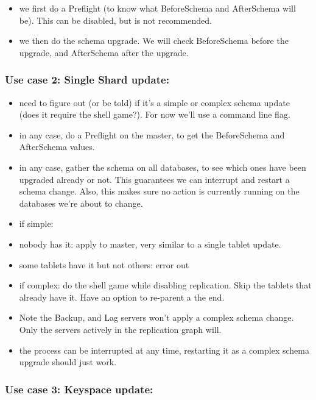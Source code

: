\begin{itemize}
\item we first do a Preflight (to know what BeforeSchema and AfterSchema will be). This can be disabled, but is not recommended.
\item we then do the schema upgrade. We will check BeforeSchema before the upgrade, and AfterSchema after the upgrade.
\end{itemize}

\subsubsection{Use case 2: Single Shard update:}\hypertarget{use-case-2-single-shard-update}{}\label{use-case-2-single-shard-update}

\begin{itemize}
\item need to figure out (or be told) if it’s a simple or complex schema update (does it require the shell game?). For now we'll use a command line flag.
\item in any case, do a Preflight on the master, to get the BeforeSchema and AfterSchema values.
\item in any case, gather the schema on all databases, to see which ones have been upgraded already or not. This guarantees we can interrupt and restart a schema change. Also, this makes sure no action is currently running on the databases we're about to change.
\item if simple:
\item nobody has it: apply to master, very similar to a single tablet update.
\item some tablets have it but not others: error out
\item if complex: do the shell game while disabling replication. Skip the tablets that already have it. Have an option to re-parent a the end.
\item Note the Backup, and Lag servers won't apply a complex schema change. Only the servers actively in the replication graph will.
\item the process can be interrupted at any time, restarting it as a complex schema upgrade should just work.
\end{itemize}

\subsubsection{Use case 3: Keyspace update:}\hypertarget{use-case-3-keyspace-update}{}\label{use-case-3-keyspace-update}

